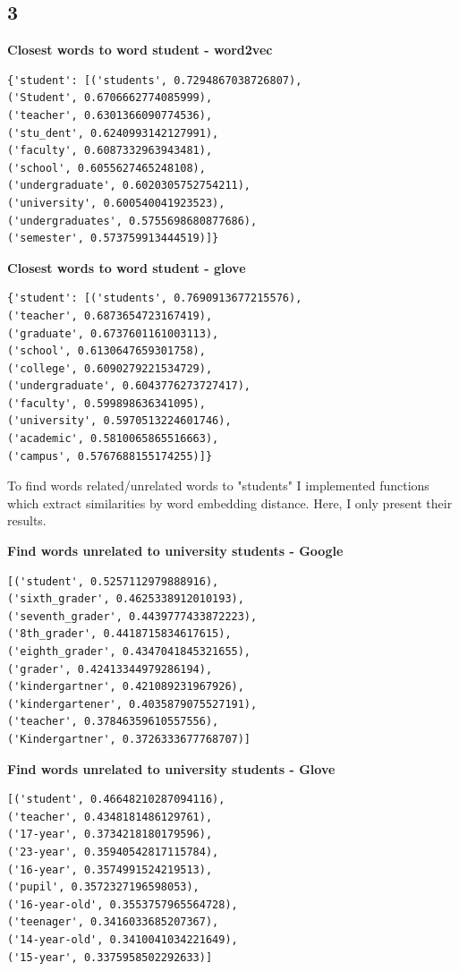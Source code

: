 \documentclass[8pt,a4paper]{report}%
\begin{document}
\subsection*{3}

\textbf{Closest words to word student - word2vec}

\begin{lstlisting}
{'student': [('students', 0.7294867038726807),
('Student', 0.6706662774085999),
('teacher', 0.6301366090774536),
('stu_dent', 0.6240993142127991),
('faculty', 0.6087332963943481),
('school', 0.6055627465248108),
('undergraduate', 0.6020305752754211),
('university', 0.600540041923523),
('undergraduates', 0.5755698680877686),
('semester', 0.573759913444519)]}
\end{lstlisting}


\textbf{Closest words to word student - glove}

\begin{lstlisting}
{'student': [('students', 0.7690913677215576),
('teacher', 0.6873654723167419),
('graduate', 0.6737601161003113),
('school', 0.6130647659301758),
('college', 0.6090279221534729),
('undergraduate', 0.6043776273727417),
('faculty', 0.599898636341095),
('university', 0.5970513224601746),
('academic', 0.5810065865516663),
('campus', 0.5767688155174255)]}
\end{lstlisting}

To find words related/unrelated words to "students" I implemented functions which extract similarities by word embedding distance. Here, I only present their results.

\textbf{Find words unrelated to university students - Google}

\begin{lstlisting}
[('student', 0.5257112979888916),
('sixth_grader', 0.4625338912010193),
('seventh_grader', 0.4439777433872223),
('8th_grader', 0.4418715834617615),
('eighth_grader', 0.4347041845321655),
('grader', 0.42413344979286194),
('kindergartner', 0.421089231967926),
('kindergartener', 0.4035879075527191),
('teacher', 0.37846359610557556),
('Kindergartner', 0.3726333677768707)]
\end{lstlisting}

\textbf{Find words unrelated to university students - Glove}

\begin{lstlisting}
[('student', 0.46648210287094116),
('teacher', 0.4348181486129761),
('17-year', 0.3734218180179596),
('23-year', 0.35940542817115784),
('16-year', 0.3574991524219513),
('pupil', 0.3572327196598053),
('16-year-old', 0.3553757965564728),
('teenager', 0.3416033685207367),
('14-year-old', 0.3410041034221649),
('15-year', 0.3375958502292633)]
\end{lstlisting}
\end{document}
